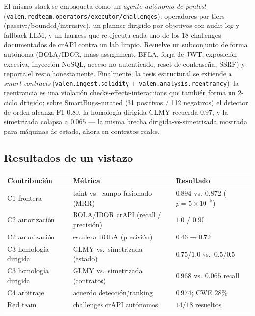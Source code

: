 \documentclass[11pt]{article}
\begin{document}
El mismo stack se empaqueta como un \emph{agente autónomo de pentest}
(\texttt{valen.redteam.operators/executor/challenges}): operadores por tiers
(passive/bounded/intrusive), un planner dirigido por objetivos con audit log y
fallback LLM, y un harness que re-ejecuta cada uno de los 18 challenges
documentados de crAPI contra un lab limpio. Resuelve un subconjunto de forma
autónoma (BOLA/IDOR, mass assignment, BFLA, forja de JWT, exposición excesiva,
inyección NoSQL, acceso no autenticado, reset de contraseña, SSRF) y reporta el
resto honestamente. Finalmente, la tesis estructural se extiende a \emph{smart
contracts} (\texttt{valen.ingest.solidity} + \texttt{valen.analysis.reentrancy}):
la reentrancia es una violación checks-effects-interactions que también forma un
2-ciclo dirigido; sobre SmartBugs-curated (31 positivos / 112 negativos) el
detector de orden alcanza F1 $0.80$, la homología dirigida GLMY recuerda $0.97$,
y la simetrizada colapsa a $0.065$ --- la misma brecha dirigida-vs-simetrizada
mostrada para máquinas de estado, ahora en contratos reales.

\subsection{Resultados de un vistazo}
\begin{center}
\small
\begin{tabular}{@{}lll@{}}
\toprule
\textbf{Contribución} & \textbf{Métrica} & \textbf{Resultado} \\
\midrule
C1 frontera & taint vs.\ campo fusionado (MRR) & $0.894$ vs.\ $0.872$ ($p=5\times10^{-5}$) \\
C2 autorización & BOLA/IDOR crAPI (recall / precisión) & $1.0$ / $0.90$ \\
C2 autorización & escalera BOLA (precisión) & $0.46\to0.72$ \\
C3 homología dirigida & GLMY vs.\ simetrizada (estado) & $0.75$/$1.0$ vs.\ $0.5$/$0.5$ \\
C3 homología dirigida & GLMY vs.\ simetrizada (contratos) & $0.968$ vs.\ $0.065$ recall \\
C4 arbitraje & acuerdo detección/ranking & $0.974$; CWE $28\%$ \\
Red team & challenges crAPI autónomos & $14/18$ resueltos \\
\bottomrule
\end{tabular}
\end{center}


\end{document}
